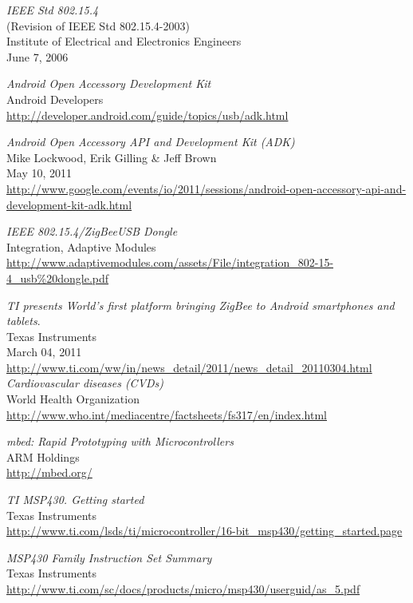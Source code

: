 \begin{thebibliography}{widest-label}
	\emph{IEEE Std 802.15.4}\\
	(Revision of IEEE Std 802.15.4-2003)\\
	Institute of Electrical and Electronics Engineers\\
	June 7, 2006
	
	\emph{Android Open Accessory Development Kit}\\
	Android Developers\\
	\url{http://developer.android.com/guide/topics/usb/adk.html}
	
	\emph{Android Open Accessory API and Development Kit (ADK)}\\
	Mike Lockwood, Erik Gilling \& Jeff Brown\\
	May 10, 2011\\
	\url{http://www.google.com/events/io/2011/sessions/android-open-accessory-api-and-development-kit-adk.html}
	
	\emph{IEEE 802.15.4/ZigBee\texttrademark USB Dongle}\\
	Integration, Adaptive Modules\\
	\url{http://www.adaptivemodules.com/assets/File/integration_802-15-4_usb\%20dongle.pdf}	

	\emph{TI presents World’s first platform bringing ZigBee to Android smartphones and tablets}.\\
 	Texas Instruments\\
	March 04, 2011\\
 	\url{http://www.ti.com/ww/in/news_detail/2011/news_detail_20110304.html}\\
	
	\emph{Cardiovascular diseases (CVDs)}\\
	World Health Organization\\
	\url{http://www.who.int/mediacentre/factsheets/fs317/en/index.html}
 	
	\emph{mbed: Rapid Prototyping with Microcontrollers}\\
	ARM Holdings\\
	\url{http://mbed.org/}
	
	\emph{TI MSP430. Getting started}\\
	Texas Instruments\\
	\url{http://www.ti.com/lsds/ti/microcontroller/16-bit_msp430/getting_started.page}
	
	\emph{MSP430 Family Instruction Set Summary}\\
	Texas Instruments\\
	\url{http://www.ti.com/sc/docs/products/micro/msp430/userguid/as_5.pdf}
	

\end{thebibliography}
